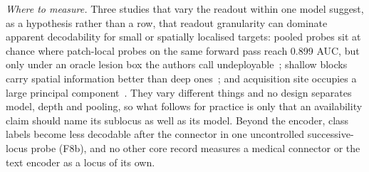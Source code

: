 \emph{Where to measure.} Three studies that vary the readout within one model suggest, as a hypothesis
rather than a row, that readout granularity can dominate apparent decodability for small or spatially
localised targets: pooled probes sit at chance where patch-local probes on the same forward pass reach
0.899 AUC, but only under an oracle lesion box the authors call undeployable~\cite{muthyala2026frozen};
shallow blocks carry spatial information better than deep ones~\cite{vadori2025mind}; and acquisition
site occupies a large principal component~\cite{rahbar2026frozen}. They vary different things and no
design separates model, depth and pooling, so what follows for practice is only that an availability
claim should name its sublocus as well as its model. Beyond the encoder, class labels become less
decodable after the connector in one uncontrolled successive-locus probe (F8b), and no other core record
measures a medical connector or the text encoder as a locus of its own.


